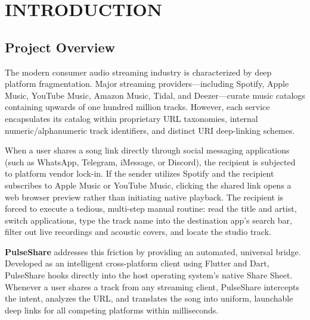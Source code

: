 \documentclass[12pt,a4paper]{report}
\begin{document}
\newpage
{}
\setcounter{page}{1}

\chapter{INTRODUCTION}

\section{Project Overview}
The modern consumer audio streaming industry is characterized by deep platform fragmentation. Major streaming providers---including Spotify, Apple Music, YouTube Music, Amazon Music, Tidal, and Deezer---curate music catalogs containing upwards of one hundred million tracks. However, each service encapsulates its catalog within proprietary URL taxonomies, internal numeric/alphanumeric track identifiers, and distinct URI deep-linking schemes.

When a user shares a song link directly through social messaging applications (such as WhatsApp, Telegram, iMessage, or Discord), the recipient is subjected to platform vendor lock-in. If the sender utilizes Spotify and the recipient subscribes to Apple Music or YouTube Music, clicking the shared link opens a web browser preview rather than initiating native playback. The recipient is forced to execute a tedious, multi-step manual routine: read the title and artist, switch applications, type the track name into the destination app's search bar, filter out live recordings and acoustic covers, and locate the studio track.

\textbf{PulseShare} addresses this friction by providing an automated, universal bridge. Developed as an intelligent cross-platform client using Flutter and Dart, PulseShare hooks directly into the host operating system's native Share Sheet. Whenever a user shares a track from any streaming client, PulseShare intercepts the intent, analyzes the URL, and translates the song into uniform, launchable deep links for all competing platforms within milliseconds.
\end{document}
